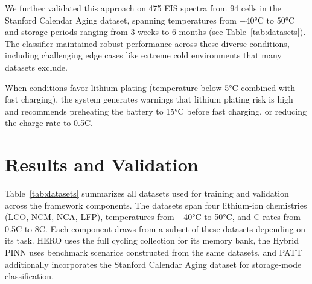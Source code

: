 \documentclass[5p,times,authoryear]{elsarticle}
\begin{document}
We further validated this approach on 475 EIS spectra from 94 cells in the Stanford Calendar Aging dataset, spanning temperatures from $-$40°C to 50°C and storage periods ranging from 3 weeks to 6 months (see Table~\ref{tab:datasets}). The classifier maintained robust performance across these diverse conditions, including challenging edge cases like extreme cold environments that many datasets exclude.




When conditions favor lithium plating (temperature below 5°C combined with fast charging), the system generates warnings that lithium plating risk is high and recommends preheating the battery to 15°C before fast charging, or reducing the charge rate to 0.5C.


\section{Results and Validation}


Table~\ref{tab:datasets} summarizes all datasets used for training and validation across the framework components. The datasets span four lithium-ion chemistries (LCO, NCM, NCA, LFP), temperatures from $-$40°C to 50°C, and C-rates from 0.5C to 8C. Each component draws from a subset of these datasets depending on its task. HERO uses the full cycling collection for its memory bank, the Hybrid PINN uses benchmark scenarios constructed from the same datasets, and PATT additionally incorporates the Stanford Calendar Aging dataset for storage-mode classification.
\end{document}
